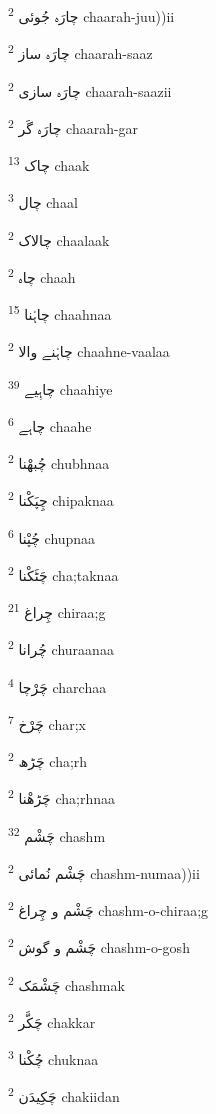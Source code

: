 \documentclass[12pt]{article}
\begin{document}
\begin{RTL}
\begin{multicols}{5}
{\ur چارَہ جُوئی}   \textsuperscript{2} chaarah-juu))ii

{\ur چارَہ ساز}   \textsuperscript{2} chaarah-saaz

{\ur چارَہ سازی}   \textsuperscript{2} chaarah-saazii

{\ur چارَہ گَر}   \textsuperscript{2} chaarah-gar

{\ur چاک}   \textsuperscript{13} chaak

{\ur چال}   \textsuperscript{3} chaal

{\ur چالاک}   \textsuperscript{2} chaalaak

{\ur چاہ}   \textsuperscript{2} chaah

{\ur چاہْنا}   \textsuperscript{15} chaahnaa

{\ur چاہْنے والا}   \textsuperscript{2} chaahne-vaalaa

{\ur چاہِیے}   \textsuperscript{39} chaahiye

{\ur چاہے}   \textsuperscript{6} chaahe

{\ur چُبھْنا}   \textsuperscript{2} chubhnaa

{\ur چِپَکْنا}   \textsuperscript{2} chipaknaa

{\ur چُپْنا}   \textsuperscript{6} chupnaa

{\ur چَٹَکْنا}   \textsuperscript{2} cha;taknaa

{\ur چِراغ}   \textsuperscript{21} chiraa;g

{\ur چُرانا}   \textsuperscript{2} churaanaa

{\ur چَرْچا}   \textsuperscript{4} charchaa

{\ur چَرْخ}   \textsuperscript{7} char;x

{\ur چَڑھ}   \textsuperscript{2} cha;rh

{\ur چَڑھْنا}   \textsuperscript{2} cha;rhnaa

{\ur چَشْم}   \textsuperscript{32} chashm

{\ur چَشْم نُمائی}   \textsuperscript{2} chashm-numaa))ii

{\ur چَشْم و چِراغ}   \textsuperscript{2} chashm-o-chiraa;g

{\ur چَشْم و گوش}   \textsuperscript{2} chashm-o-gosh

{\ur چَشْمَک}   \textsuperscript{2} chashmak

{\ur چَکَّر}   \textsuperscript{2} chakkar

{\ur چُکْنا}   \textsuperscript{3} chuknaa

{\ur چَکِیدَن}   \textsuperscript{2} chakiidan


\end{multicols}
\end{RTL}
\end{document}
